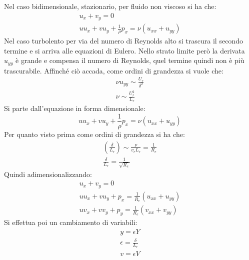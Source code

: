 Nel caso bidimensionale, stazionario, per fluido non viscoso si ha che:
%
	\begin{equation*}
		\begin{gathered}
			u_x + v_y = 0\\
			u u_x + v u_y + \frac{1}{\rho} p_x = \nu (u_{xx} + u_{yy})
		\end{gathered}
	\end{equation*}
%
Nel caso turbolento per via del numero di Reynolds alto si trascura il secondo termine e si arriva alle equazioni di Eulero.
Nello strato limite però la derivata $u_{yy}$ è grande e compensa il numero di Reynolds, quel termine quindi non è più trascurabile.
Affinché ciò accada, come ordini di grandezza si vuole che:
%
	\begin{equation*}
		\begin{gathered}
			\nu u_{yy} \sim \frac{U_r}{\delta^2}\\
			\nu \sim \frac{U^2_r}{L_r}
		\end{gathered}
	\end{equation*}
%
Si parte dall'equazione in forma dimensionale:
%
	\begin{equation*}
		u u_x + v u_y + \frac{1}{\rho} p_x = \nu (u_{xx} + u_{yy})
	\end{equation*}
%
Per quanto visto prima come ordini di grandezza si ha che:
%
	\begin{equation*}
		\begin{gathered}
			\left( \frac{\delta}{L_r} \right) \sim \frac{\nu}{v_r L_r} = \frac{1}{R_e}\\
			\frac{\delta}{L_r} = \frac{1}{\sqrt{R_e}}
		\end{gathered}
	\end{equation*}
%
Quindi adimensionalizzando:
%
	\begin{equation*}
		\begin{gathered}
			u_x + v_y = 0\\
			u u_x + v u_y + p_x = \frac{1}{R_e} (u_{xx} + u_{yy})\\
			u v_x + v v_y + p_y = \frac{1}{R_e} (v_{xx} + v_{yy})
		\end{gathered}
	\end{equation*}
%
Si effettua poi un cambiamento di variabili:
%
	\begin{equation*}
		\begin{gathered}
			y = \epsilon Y\\
			\epsilon = \frac{\delta}{L_r}\\
			v = \epsilon V
		\end{gathered}
	\end{equation*}
